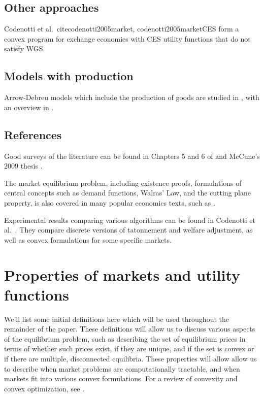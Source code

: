 \documentclass[12pt]{article}
\begin{document}
\subsection{Other approaches}
Codenotti et al.\ cite{codenotti2005market, codenotti2005marketCES} form a
convex program for exchange economies with CES utility functions that do not
satisfy WGS.

\subsection{Models with production}
Arrow-Debreu models which include the production of goods are studied
in \cite{garg2014computability,jain2005market,codenotti2005marketExcess},
with an overview in \cite[Chapters~5--6]{nisan2007algorithmic}.

\subsection{References}
Good surveys of the literature can be found in Chapters 5 and 6 of
\cite{nisan2007algorithmic} and McCune's 2009 thesis \cite{mccune2009algorithmic}.

The market equilibrium problem, including existence proofs, formulations of
central concepts such as demand functions, Walras' Law, and the cutting plane
property, is also covered in many popular economics texts, such as
\cite{varian1992microeconomic, mas1995microeconomic,
luenberger1995microeconomic, kreps1990course}.

Experimental results comparing various algorithms can be found in Codenotti
et al.\ \cite{codenotti2008experimental}.
They compare discrete versions of tatonnement and welfare adjustment,
as well as convex formulations for some specific markets.


\section{Properties of markets and utility functions}
We'll list some initial definitions here which will be used throughout the remainder of the paper.
These definitions will allow us to discuss various aspects of the
equilibrium problem, such as describing the set of equilibrium prices
in terms of whether such prices exist, if they are unique, and if the set is convex or if there are multiple, disconnected equilibria.
These properties will allow allow us to describe when market problems
are computationally tractable, and when markets fit into
various convex formulations.
For a review of convexity and convex optimization, see
\cite{boyd2009convex}.
\end{document}
